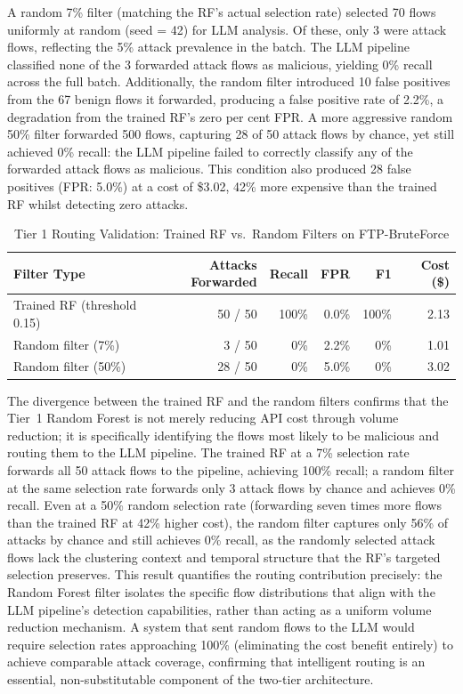 \documentclass[../main.tex]{subfiles}
\begin{document}
A random 7\% filter (matching the RF's actual selection rate) selected 70 flows uniformly at random (seed = 42) for LLM analysis. Of these, only 3 were attack flows, reflecting the 5\% attack prevalence in the batch. The LLM pipeline classified none of the 3 forwarded attack flows as malicious, yielding 0\% recall across the full batch. Additionally, the random filter introduced 10 false positives from the 67 benign flows it forwarded, producing a false positive rate of 2.2\%, a degradation from the trained RF's zero per cent FPR. A more aggressive random 50\% filter forwarded 500 flows, capturing 28 of 50 attack flows by chance, yet still achieved 0\% recall: the LLM pipeline failed to correctly classify any of the forwarded attack flows as malicious. This condition also produced 28 false positives (FPR: 5.0\%) at a cost of \$3.02, 42\% more expensive than the trained RF whilst detecting zero attacks.

\begin{table}[H]
\centering
\caption{Tier 1 Routing Validation: Trained RF vs.\ Random Filters on FTP-BruteForce}
\label{tab:routing-control}
\small
\begin{tabular}{l r r r r r}
\toprule
Filter Type & Attacks Forwarded & Recall & FPR & F1 & Cost (\$) \\
\midrule
Trained RF (threshold 0.15) & 50 / 50 & 100\% & 0.0\% & 100\% & 2.13 \\
Random filter (7\%) & 3 / 50 & 0\% & 2.2\% & 0\% & 1.01 \\
Random filter (50\%) & 28 / 50 & 0\% & 5.0\% & 0\% & 3.02 \\
\bottomrule
\end{tabular}
\end{table}

The divergence between the trained RF and the random filters confirms that the Tier~1 Random Forest is not merely reducing API cost through volume reduction; it is specifically identifying the flows most likely to be malicious and routing them to the LLM pipeline. The trained RF at a 7\% selection rate forwards all 50 attack flows to the pipeline, achieving 100\% recall; a random filter at the same selection rate forwards only 3 attack flows by chance and achieves 0\% recall. Even at a 50\% random selection rate (forwarding seven times more flows than the trained RF at 42\% higher cost), the random filter captures only 56\% of attacks by chance and still achieves 0\% recall, as the randomly selected attack flows lack the clustering context and temporal structure that the RF's targeted selection preserves. This result quantifies the routing contribution precisely: the Random Forest filter isolates the specific flow distributions that align with the LLM pipeline's detection capabilities, rather than acting as a uniform volume reduction mechanism. A system that sent random flows to the LLM would require selection rates approaching 100\% (eliminating the cost benefit entirely) to achieve comparable attack coverage, confirming that intelligent routing is an essential, non-substitutable component of the two-tier architecture.

\onlystandalone{\printbibliography}
\end{document}

